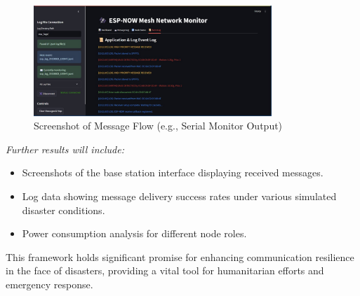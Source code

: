 \documentclass[12pt, a4paper]{article}
\begin{document}
\begin{figure}[H]
    \centering
    \includegraphics[width=0.8\textwidth]{prototype3.jpg} %
    \caption{Screenshot of Message Flow (e.g., Serial Monitor Output)}
    \label{fig:message_flow}
\end{figure}

\textit{Further results will include:}
\begin{itemize}
    \item Screenshots of the base station interface displaying received messages.
    \item Log data showing message delivery success rates under various simulated disaster conditions.
    \item Power consumption analysis for different node roles.
\end{itemize}
This framework holds significant promise for enhancing communication resilience in the face of disasters, providing a vital tool for humanitarian efforts and emergency response.

\clearpage
\end{document}
